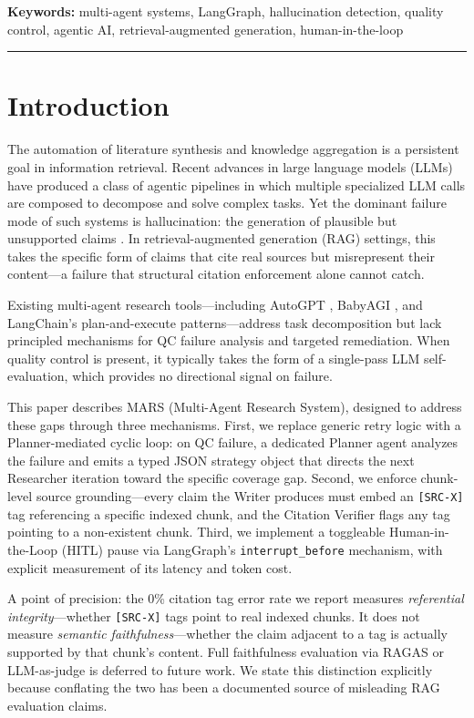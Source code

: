 \documentclass[11pt]{article}
\begin{document}
\textbf{Keywords:} multi-agent systems, LangGraph, hallucination detection, quality
control, agentic AI, retrieval-augmented generation, human-in-the-loop

\hrule

\section{Introduction}

The automation of literature synthesis and knowledge aggregation is a persistent
goal in information retrieval. Recent advances in large language models (LLMs)
have produced a class of agentic pipelines in which multiple specialized LLM
calls are composed to decompose and solve complex tasks. Yet the dominant failure
mode of such systems is hallucination: the generation of plausible but
unsupported claims \citep{ji2023hallucination}. In retrieval-augmented
generation (RAG) settings, this takes the specific form of claims that cite real
sources but misrepresent their content---a failure that structural citation
enforcement alone cannot catch.

Existing multi-agent research tools---including AutoGPT \citep{toran2023autogpt},
BabyAGI \citep{nakajima2023babyagi}, and LangChain's plan-and-execute
patterns---address task decomposition but lack principled mechanisms for QC
failure analysis and targeted remediation. When quality control is present, it
typically takes the form of a single-pass LLM self-evaluation, which provides no
directional signal on failure.

This paper describes MARS (Multi-Agent Research System), designed to address
these gaps through three mechanisms. First, we replace generic retry logic with a
Planner-mediated cyclic loop: on QC failure, a dedicated Planner agent analyzes
the failure and emits a typed JSON strategy object that directs the next
Researcher iteration toward the specific coverage gap. Second, we enforce
chunk-level source grounding---every claim the Writer produces must embed an
\texttt{[SRC-X]} tag referencing a specific indexed chunk, and the Citation
Verifier flags any tag pointing to a non-existent chunk. Third, we implement a
toggleable Human-in-the-Loop (HITL) pause via LangGraph's
\texttt{interrupt\_before} mechanism, with explicit measurement of its latency
and token cost.

A point of precision: the 0\% citation tag error rate we report measures
\emph{referential integrity}---whether \texttt{[SRC-X]} tags point to real
indexed chunks. It does not measure \emph{semantic faithfulness}---whether the
claim adjacent to a tag is actually supported by that chunk's content. Full
faithfulness evaluation via RAGAS \citep{es2023ragas} or LLM-as-judge is
deferred to future work. We state this distinction explicitly because conflating
the two has been a documented source of misleading RAG evaluation claims.
\end{document}
